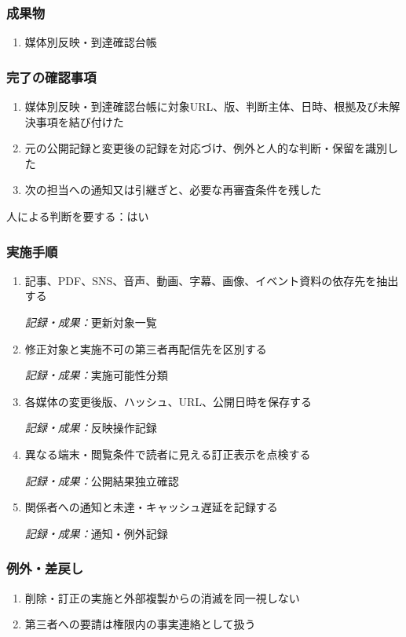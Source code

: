 \documentclass[a4paper,11pt]{article}
\begin{document}
\subsubsection*{成果物}
\begin{enumerate}[leftmargin=2em,itemsep=0.35em]
\item 媒体別反映・到達確認台帳
\end{enumerate}
\subsubsection*{完了の確認事項}
\begin{enumerate}[leftmargin=2em,itemsep=0.35em]
\item 媒体別反映・到達確認台帳に対象URL、版、判断主体、日時、根拠及び未解決事項を結び付けた
\item 元の公開記録と変更後の記録を対応づけ、例外と人的な判断・保留を識別した
\item 次の担当への通知又は引継ぎと、必要な再審査条件を残した
\end{enumerate}
\par 人による判断を要する：はい\par\medskip
\subsubsection*{実施手順}
\begin{enumerate}[leftmargin=2em,itemsep=0.65em]
\item 記事、PDF、SNS、音声、動画、字幕、画像、イベント資料の依存先を抽出する\par\noindent\textit{記録・成果：}更新対象一覧\nobreak\smallskip
\item 修正対象と実施不可の第三者再配信先を区別する\par\noindent\textit{記録・成果：}実施可能性分類\nobreak\smallskip
\item 各媒体の変更後版、ハッシュ、URL、公開日時を保存する\par\noindent\textit{記録・成果：}反映操作記録\nobreak\smallskip
\item 異なる端末・閲覧条件で読者に見える訂正表示を点検する\par\noindent\textit{記録・成果：}公開結果独立確認\nobreak\smallskip
\item 関係者への通知と未達・キャッシュ遅延を記録する\par\noindent\textit{記録・成果：}通知・例外記録\nobreak\smallskip
\end{enumerate}
\subsubsection*{例外・差戻し}
\begin{enumerate}[leftmargin=2em,itemsep=0.35em]
\item 削除・訂正の実施と外部複製からの消滅を同一視しない
\item 第三者への要請は権限内の事実連絡として扱う
\end{enumerate}
\end{document}
